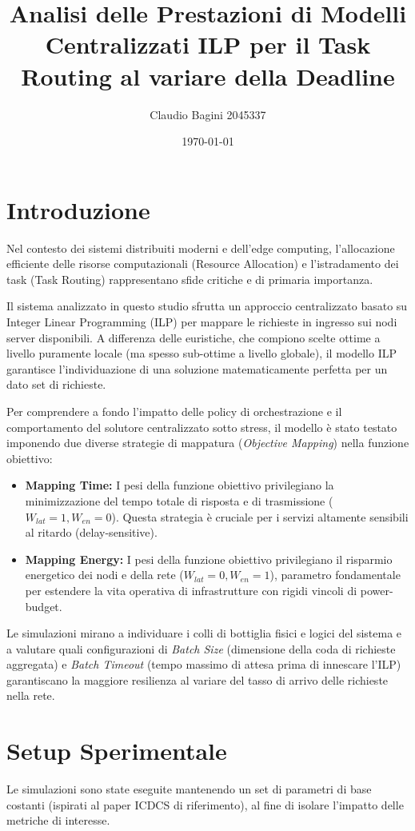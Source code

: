 \documentclass[11pt,a4paper]{article}
\title{\textbf{Analisi delle Prestazioni di Modelli Centralizzati ILP per il Task Routing al variare della Deadline}}
\author{Claudio Bagini 2045337}
\date{\today}
\begin{document}
\maketitle

\section{Introduzione}
Nel contesto dei sistemi distribuiti moderni e dell'edge computing, l'allocazione efficiente delle risorse computazionali (Resource Allocation) e l'istradamento dei task (Task Routing) rappresentano sfide critiche e di primaria importanza. 

Il sistema analizzato in questo studio sfrutta un approccio centralizzato basato su Integer Linear Programming (ILP) per mappare le richieste in ingresso sui nodi server disponibili. A differenza delle euristiche, che compiono scelte ottime a livello puramente locale (ma spesso sub-ottime a livello globale), il modello ILP garantisce l'individuazione di una soluzione matematicamente perfetta per un dato set di richieste.

Per comprendere a fondo l'impatto delle policy di orchestrazione e il comportamento del solutore centralizzato sotto stress, il modello è stato testato imponendo due diverse strategie di mappatura (\textit{Objective Mapping}) nella funzione obiettivo:
\begin{itemize}
    \item \textbf{Mapping Time:} I pesi della funzione obiettivo privilegiano la minimizzazione del tempo totale di risposta e di trasmissione ($W_{lat}=1, W_{en}=0$). Questa strategia è cruciale per i servizi altamente sensibili al ritardo (delay-sensitive).
    \item \textbf{Mapping Energy:} I pesi della funzione obiettivo privilegiano il risparmio energetico dei nodi e della rete ($W_{lat}=0, W_{en}=1$), parametro fondamentale per estendere la vita operativa di infrastrutture con rigidi vincoli di power-budget.
\end{itemize}
Le simulazioni mirano a individuare i colli di bottiglia fisici e logici del sistema e a valutare quali configurazioni di \textit{Batch Size} (dimensione della coda di richieste aggregata) e \textit{Batch Timeout} (tempo massimo di attesa prima di innescare l'ILP) garantiscano la maggiore resilienza al variare del tasso di arrivo delle richieste nella rete.

\section{Setup Sperimentale}
Le simulazioni sono state eseguite mantenendo un set di parametri di base costanti (ispirati al paper ICDCS di riferimento), al fine di isolare l'impatto delle metriche di interesse.
\end{document}
